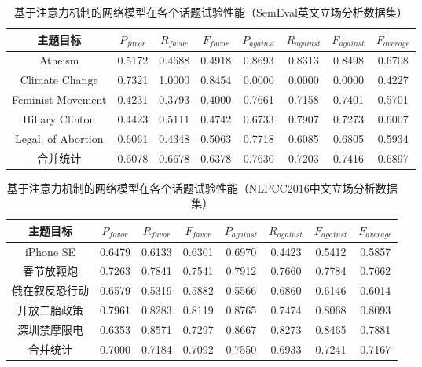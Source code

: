 \begin{table}[htbp]
	\caption[table123]{基于注意力机制的网络模型在各个话题试验性能（SemEval英文立场分析数据集）}
	\label{a_bi_gru_cnn_semeval}
	\vspace{0.5em}\centering\wuhao
	\begin{tabular}{cccccccc}
		\toprule[1.5pt]
		主题目标& $P_{favor}$&$R_{favor}$&$F_{favor}$&$P_{against}$&$R_{against}$&$F_{against}$&$F_{average}$ \\
		\midrule[1pt]
		Atheism&0.5172&0.4688&0.4918&0.8693&0.8313&0.8498&0.6708\\
		Climate Change&0.7321&1.0000&0.8454&0.0000&0.0000&0.0000&0.4227\\
		Feminist Movement&0.4231&0.3793&0.4000&0.7661&0.7158&0.7401&0.5701\\
		Hillary Clinton&0.4423&0.5111&0.4742&0.6733&0.7907&0.7273&0.6007\\
		Legal. of Abortion&0.6061&0.4348&0.5063&0.7718&0.6085&0.6805&0.5934\\
		合并统计&0.6078&0.6678&0.6378&0.7630&0.7203&0.7416&0.6897\\
		\bottomrule[1.5pt]
	\end{tabular}
\end{table}

\begin{table}[htbp]
	\caption[table123]{基于注意力机制的网络模型在各个话题试验性能（NLPCC2016中文立场分析数据集）}
	\label{chinese_a_bi_gru_cnn_semeval}
	\vspace{0.5em}\centering\wuhao
	\begin{tabular}{cccccccc}
		\toprule[1.5pt]
		主题目标& $P_{favor}$&$R_{favor}$&$F_{favor}$&$P_{against}$&$R_{against}$&$F_{against}$&$F_{average}$ \\
		\midrule[1pt]
		iPhone SE&0.6479&0.6133&0.6301&0.6970&0.4423&0.5412&0.5857\\
		春节放鞭炮&0.7263&0.7841&0.7541&0.7912&0.7660&0.7784&0.7662\\
		俄在叙反恐行动&0.6579&0.5319&0.5882&0.5566&0.6860&0.6146&0.6014\\
		开放二胎政策&0.7961&0.8283&0.8119&0.8765&0.7474&0.8068&0.8093\\
		深圳禁摩限电&0.6353&0.8571&0.7297&0.8667&0.8273&0.8465&0.7881\\
		合并统计&0.7000&0.7184&0.7092&0.7550&0.6933&0.7241&0.7167\\
		\bottomrule[1.5pt]
	\end{tabular}
\end{table}

